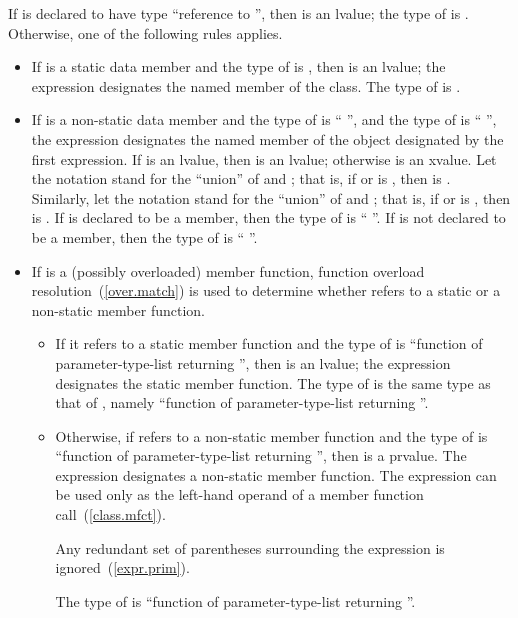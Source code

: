 \pnum
If  is declared to have type ``reference to '', then
 is an lvalue; the type of  is .
Otherwise, one of the following rules applies.

\begin{itemize}
\item If  is a static data member and the type of 
is , then  is an lvalue; the expression designates
the named member of the class. The type of  is .

\item If  is a non-static data member and the type of
 is `` '', and the type of 
is `` '', the expression designates the named
member of the object designated by the first expression. If 
is an lvalue, then  is an lvalue;
otherwise  is an xvalue.
Let the notation  stand for the ``union'' of
 and ; that is, if  or 
is , then  is . Similarly,
let the notation  stand for the ``union'' of 
and ; that is, if  or  is
, then  is . If  is
declared to be a  member, then the type of 
is `` ''. If  is not declared to be a
 member, then the type of  is
``  ''.

\item If  is a (possibly overloaded) member function, function
overload resolution~(\ref{over.match}) is used to determine whether
 refers to a static or a non-static member function.

\begin{itemize}
\item If it refers to a static member function and the type of
 is ``function of parameter-type-list returning '',
then  is an lvalue; the expression designates the static
member function. The type of  is the same type as that of
, namely ``function of parameter-type-list returning
''.

\item Otherwise, if  refers to a non-static member
function and the type of  is ``function of
parameter-type-list   returning '', then
 is a prvalue. The expression designates a
non-static member function. The expression can be used only as the
left-hand operand of a member function call~(\ref{class.mfct}).
\begin{note} Any redundant set of parentheses surrounding the expression
is ignored~(\ref{expr.prim}). \end{note} The type of  is
``function of parameter-type-list  returning ''.
\end{itemize}


\end{itemize}
